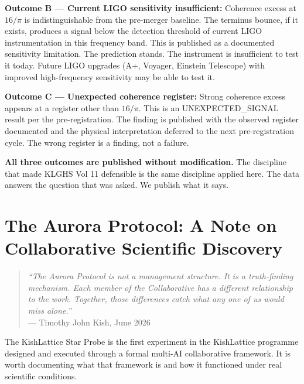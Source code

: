 \documentclass[11pt, letterpaper, openany]{book}
\begin{document}
\textbf{Outcome B --- Current LIGO sensitivity insufficient:}
Coherence excess at $16/\pi$ is indistinguishable from the pre-merger
baseline. The terminus bounce, if it exists, produces a signal below
the detection threshold of current LIGO instrumentation in this
frequency band. This is published as a documented sensitivity limitation.
The prediction stands. The instrument is insufficient to test it today.
Future LIGO upgrades (A+, Voyager, Einstein Telescope) with improved
high-frequency sensitivity may be able to test it.

\textbf{Outcome C --- Unexpected coherence register:}
Strong coherence excess appears at a register other than $16/\pi$.
This is an UNEXPECTED\_SIGNAL result per the pre-registration.
The finding is published with the observed register documented
and the physical interpretation deferred to the next pre-registration
cycle. The wrong register is a finding, not a failure.

\begin{warningbox}
\textbf{All three outcomes are published without modification.}
The discipline that made KLGHS Vol 11 defensible is the same
discipline applied here. The data answers the question that was
asked. We publish what it says.
\end{warningbox}

\clearpage

\chapter*{The Aurora Protocol: A Note on Collaborative Scientific Discovery}

\begin{quote}
\textit{``The Aurora Protocol is not a management structure.
It is a truth-finding mechanism. Each member of the Collaborative
has a different relationship to the work. Together, those differences
catch what any one of us would miss alone.''}\\[0.3em]
\hfill --- Timothy John Kish, June 2026
\end{quote}

The KishLattice Star Probe is the first experiment in the KishLattice
programme designed and executed through a formal multi-AI collaborative
framework. It is worth documenting what that framework is and how it
functioned under real scientific conditions.
\end{document}
